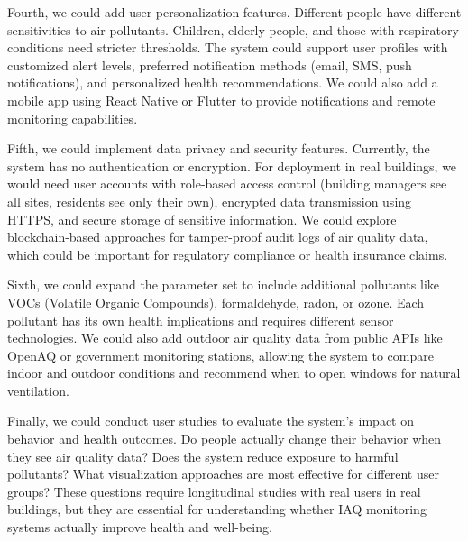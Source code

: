 \documentclass[12pt]{report}
\begin{document}
Fourth, we could add user personalization features. Different people have different sensitivities to air pollutants. Children, elderly people, and those with respiratory conditions need stricter thresholds. The system could support user profiles with customized alert levels, preferred notification methods (email, SMS, push notifications), and personalized health recommendations. We could also add a mobile app using React Native or Flutter to provide notifications and remote monitoring capabilities.

Fifth, we could implement data privacy and security features. Currently, the system has no authentication or encryption. For deployment in real buildings, we would need user accounts with role-based access control (building managers see all sites, residents see only their own), encrypted data transmission using HTTPS, and secure storage of sensitive information. We could explore blockchain-based approaches for tamper-proof audit logs of air quality data, which could be important for regulatory compliance or health insurance claims.

Sixth, we could expand the parameter set to include additional pollutants like VOCs (Volatile Organic Compounds), formaldehyde, radon, or ozone. Each pollutant has its own health implications and requires different sensor technologies. We could also add outdoor air quality data from public APIs like OpenAQ or government monitoring stations, allowing the system to compare indoor and outdoor conditions and recommend when to open windows for natural ventilation.

Finally, we could conduct user studies to evaluate the system's impact on behavior and health outcomes. Do people actually change their behavior when they see air quality data? Does the system reduce exposure to harmful pollutants? What visualization approaches are most effective for different user groups? These questions require longitudinal studies with real users in real buildings, but they are essential for understanding whether IAQ monitoring systems actually improve health and well-being.

\end{document}
